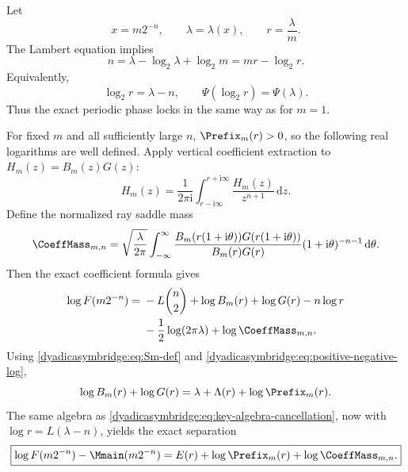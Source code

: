 \documentclass[11pt,oneside]{article}
\theoremstyle{definition}
\theoremstyle{remark}
\newcommand{\ii}{\mathrm i}
\newcommand{\dd}{\,\mathrm d}
\begin{document}
Let
\begin{equation}
 x=m2^{-n},
 \qquad
 \lambda=\lambda(x),
 \qquad
 r=\frac\lambda m.
\label{dyadicasymbridge:eq:fixed-m-parameters}
\end{equation}
The Lambert equation implies
\begin{equation}
 n=\lambda-\log_2\lambda+\log_2m
 =mr-\log_2r.
\label{dyadicasymbridge:eq:fixed-m-saddle-relation}
\end{equation}
Equivalently,
\begin{equation}
 \log_2r=\lambda-n,
 \qquad
 \Psi(\log_2r)=\Psi(\lambda).
\label{dyadicasymbridge:eq:fixed-m-phase-lock}
\end{equation}
Thus the exact periodic phase locks in the same way as for $m=1$.

For fixed $m$ and all sufficiently large $n$, $\Prefix_m(r)>0$, so the following real logarithms are well defined.  Apply vertical coefficient extraction to
$H_m(z)=B_m(z)G(z)$:
\begin{equation}
 [z^n]H_m(z)=
 \frac1{2\pi\ii}\int_{r-\ii\infty}^{r+\ii\infty}
 \frac{H_m(z)}{z^{n+1}}\dd z.
\label{dyadicasymbridge:eq:Hm-vertical}
\end{equation}
Define the normalized ray saddle mass
\begin{equation}
 \CoeffMass_{m,n}=
 \sqrt{\frac\lambda{2\pi}}
 \int_{-\infty}^{\infty}
 \frac{B_m(r(1+\ii\theta))G(r(1+\ii\theta))}
 {B_m(r)G(r)}
 (1+\ii\theta)^{-n-1}\dd\theta.
\label{dyadicasymbridge:eq:Cmn-def}
\end{equation}
Then the exact coefficient formula gives
\begin{align}
 \log F(m2^{-n})
 ={}&-L\binom n2+\log B_m(r)+\log G(r)-n\log r    \notag\\
 &-\frac12\log(2\pi\lambda)+\log\CoeffMass_{m,n}.
\label{dyadicasymbridge:eq:fixed-m-exact-log}
\end{align}
Using \eqref{dyadicasymbridge:eq:Sm-def} and \eqref{dyadicasymbridge:eq:positive-negative-log},
\begin{equation}
 \log B_m(r)+\log G(r)
 =\lambda+\Lambda(r)+\log\Prefix_m(r).
\label{dyadicasymbridge:eq:BmG-real}
\end{equation}
The same algebra as \eqref{dyadicasymbridge:eq:key-algebra-cancellation}, now with
$\log r=L(\lambda-n)$, yields the exact separation
\begin{equation}
 \boxed{
 \log F(m2^{-n})-\Mmain(m2^{-n})
 =E(r)+\log\Prefix_m(r)+\log\CoeffMass_{m,n}.}
\label{dyadicasymbridge:eq:fixed-m-exact-separation}
\end{equation}
\end{document}
